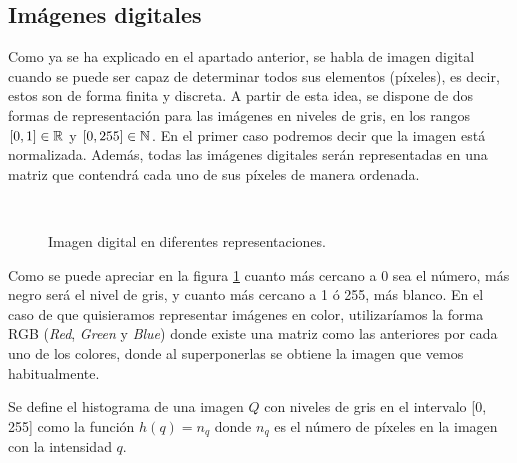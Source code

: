 \subsection{Imágenes digitales}
Como ya se ha explicado en el apartado anterior, se habla de imagen digital cuando se puede ser capaz de determinar todos sus elementos (píxeles), es decir, estos son de forma finita y discreta. A partir de esta idea, se dispone de dos formas de representación para las imágenes en niveles de gris, en los rangos $[0,1]\in\mathbb{R}$ y $[0,255]\in\mathbb{N}$. En el primer caso podremos decir que la imagen está normalizada. Además, todas las imágenes digitales serán representadas en una matriz que contendrá cada uno de sus píxeles de manera ordenada.


\begin{figure}
\centering
    \quad
    \quad\ 
    \caption{Imagen digital en diferentes representaciones.}
    \label{fig:defimagen}
\end{figure}

Como se puede apreciar en la figura \ref{fig:defimagen} cuanto más cercano a 0 sea el número, más negro será el nivel de gris, y cuanto más cercano a 1 ó 255, más blanco. En el caso de que quisieramos representar imágenes en color, utilizaríamos la forma RGB ({\em Red}, {\em Green} y {\em Blue}) donde existe una matriz como las anteriores por cada uno de los colores, donde al superponerlas se obtiene la imagen que vemos habitualmente.

\begin{definition}\label{def:histograma}
Se define el histograma de una imagen $Q$ con niveles de gris en el intervalo [0, 255] como la función $h(q) = n_q$ donde $n_q$ es el número de píxeles en la imagen con la intensidad $q$.
\end{definition}

